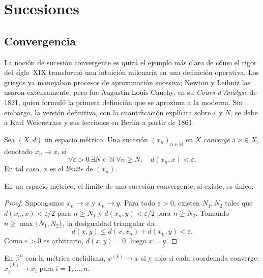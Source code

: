 \chapter{Sucesiones}
\label{ch:sucesiones}

\section{Convergencia}

La noción de sucesión convergente es quizá el ejemplo más claro de cómo el rigor del siglo~XIX transformó una intuición milenaria en una definición operativa. Los griegos ya manejaban procesos de aproximación sucesiva; Newton y Leibniz las usaron extensamente; pero fue Augustin-Louis Cauchy, en su \emph{Cours d'Analyse} de 1821, quien formuló la primera definición que se aproxima a la moderna. Sin embargo, la versión definitiva, con la cuantificación explícita sobre $\varepsilon$ y $N$, se debe a Karl Weierstrass y sus lecciones en Berlín a partir de 1861.

\begin{definition}
\label{def:convergencia}
Sea $(X,d)$ un espacio métrico. Una sucesión $(x_n)_{n\in\mathbb{N}}$ en $X$ \emph{converge} a $x\in X$, denotado $x_n\to x$, si
\begin{equation}\label{eq:convergencia}
  \forall\varepsilon>0\ \exists N\in\mathbb{N}\ \forall n\geq N:\quad d(x_n,x)<\varepsilon.
\end{equation}
En tal caso, $x$ es el \emph{límite} de $(x_n)$.
\end{definition}

\begin{theorem}
\label{teo:unicidad-limite}
En un espacio métrico, el límite de una sucesión convergente, si existe, es único.
\end{theorem}
\begin{proof}
Supongamos $x_n\to x$ y $x_n\to y$. Para todo $\varepsilon>0$, existen $N_1,N_2$ tales que $d(x_n,x)<\varepsilon/2$ para $n\geq N_1$ y $d(x_n,y)<\varepsilon/2$ para $n\geq N_2$. Tomando $n\geq\max\{N_1,N_2\}$, la desigualdad triangular da
\[
  d(x,y)\leq d(x,x_n)+d(x_n,y)<\varepsilon.
\]
Como $\varepsilon>0$ es arbitrario, $d(x,y)=0$, luego $x=y$.
\end{proof}

\begin{proposition}
\label{prop:convergencia-componentes}
En $\mathbb{R}^n$ con la métrica euclidiana, $x^{(k)}\to x$ si y solo si cada coordenada converge: $x^{(k)}_i\to x_i$ para $i=1,\dots,n$.
\end{proposition}

